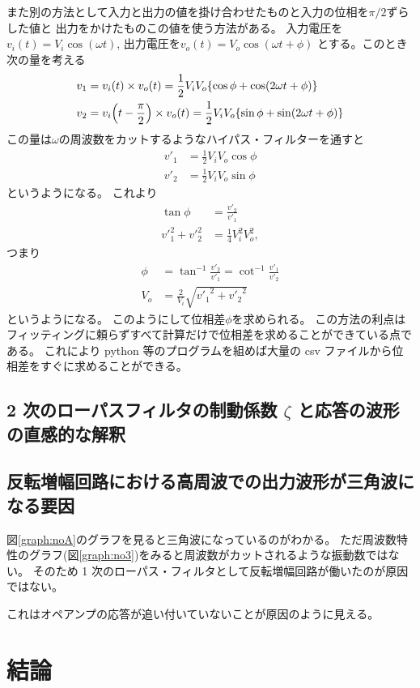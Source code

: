 \documentclass[11pt,dvipdfmx,a4paper]{jsarticle}
\begin{document}
また別の方法として入力と出力の値を掛け合わせたものと入力の位相を\(\pi/2\)ずらした値と
出力をかけたものこの値を使う方法がある。\cite{keisoku}
入力電圧を\(v_i(t) = V_i\cos(\omega t)\),
出力電圧を\(v_o(t) = V_o\cos(\omega t + \phi)\)
とする。このとき次の量を考える
\begin{align}
	v_1 &= v_i(t)\times v_o(t) = \frac{1}{2}V_i V_o \qty{\cos\phi + \cos(2\omega t + \phi)}\\
	v_2 &= v_i\qty(t-\frac{\pi}{2})\times v_o(t) = \frac{1}{2}V_i V_o \qty{\sin\phi + \sin(2\omega t + \phi)}
\end{align}
この量は\(\omega\)の周波数をカットするようなハイパス・フィルターを通すと
\begin{align}
	v'_1 &= \frac{1}{2}V_i V_o \cos\phi\\
	v'_2 &= \frac{1}{2}V_i V_o \sin\phi
\end{align}
というようになる。
これより
\begin{align}
	\tan\phi &= \frac{{v'}_2}{{v'}_1}\\
	{v'}_1^2+{v'}_2^2 &= \frac{1}{4}V_i^2V_o^2,
\end{align}
つまり
\begin{align}
	\phi &= \tan^{-1}\frac{{v'}_2}{{v'}_1} = \cot^{-1}\frac{{v'}_1}{{v'}_2}\\
	V_o &= \frac{2}{V_i}\sqrt{{{v'}_1}^2+{{v'}_2}^2}
\end{align}
というようになる。
このようにして位相差\(\phi\)を求められる。
この方法の利点はフィッティングに頼らずすべて計算だけで位相差を求めることができている点である。
これにより python 等のプログラムを組めば大量の csv ファイルから位相差をすぐに求めることができる。

\subsection{2 次のローパスフィルタの制動係数 \(\zeta\) と応答の波形の直感的な解釈}

\subsection{反転増幅回路における高周波での出力波形が三角波になる要因}
図\ref{graph:noA}のグラフを見ると三角波になっているのがわかる。
ただ周波数特性のグラフ(図\ref{graph:no3})をみると周波数がカットされるような振動数ではない。
そのため 1 次のローパス・フィルタとして反転増幅回路が働いたのが原因ではない。

これはオペアンプの応答が追い付いていないことが原因のように見える。

\section{結論}




\end{document}

